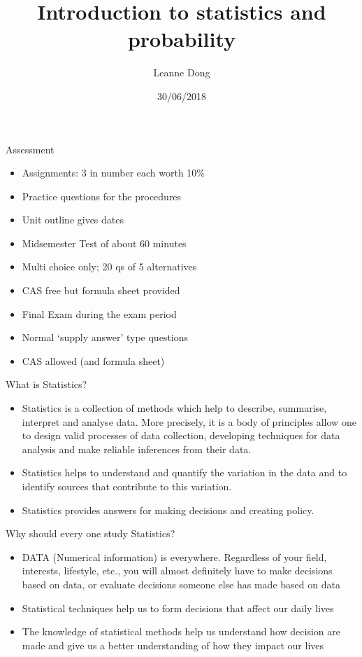 \documentclass[ignorenonframetext,]{beamer}
\title{Introduction to statistics and probability}
\author{Leanne Dong}
\date{30/06/2018}
\begin{document}
\frame{\titlepage}

\begin{frame}{Assessment}

\begin{itemize}
\item
  Assignments: 3 in number each worth 10\%
\item
  Practice questions for the procedures
\item
  Unit outline gives dates
\item
  Midsemester Test of about 60 minutes
\item
  Multi choice only; 20 qs of 5 alternatives
\item
  CAS free but formula sheet provided
\item
  Final Exam during the exam period
\item
  Normal `supply answer' type questions
\item
  CAS allowed (and formula sheet)
\end{itemize}

\end{frame}

\begin{frame}{What is Statistics?}

\begin{itemize}
\item
  Statistics is a collection of methods which help to describe,
  summarise, interpret and analyse data. More precisely, it is a body of
  principles allow one to design valid processes of data collection,
  developing techniques for data analysis and make reliable inferences
  from their data.
\item
  Statistics helps to understand and quantify the variation in the data
  and to identify sources that contribute to this variation.
\item
  Statistics provides answers for making decisions and creating policy.
\end{itemize}

\end{frame}

\begin{frame}{Why should every one study Statistics?}

\begin{itemize}
\item
  DATA (Numerical information) is everywhere. Regardless of your field,
  interests, lifestyle, etc., you will almost definitely have to make
  decisions based on data, or evaluate decisions someone else has made
  based on data
\item
  Statistical techniques help us to form decisions that affect our daily
  lives
\item
  The knowledge of statistical methods help us understand how decision
  are made and give us a better understanding of how they impact our
  lives
\end{itemize}

\end{frame}
\end{document}
